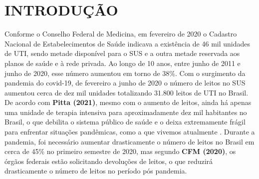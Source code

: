 \documentclass[12pt]{article}
\begin{document}
\section{INTRODUÇÃO}
Conforme o Conselho Federal de Medicina, em fevereiro de 2020 o Cadastro Nacional de Estabelecimentos de Saúde indicava a existência de 46 mil unidades de UTI, sendo metade disponível para o SUS e a outra metade reservada aos planos de saúde e à rede privada. Ao longo de 10 anos, entre junho de 2011 e junho de 2020, esse número aumentou em torno de 38\%. Com o surgimento da pandemia do covid-19, de fevereiro a junho de 2020 o número de leitos no SUS aumentou cerca de dez mil unidades totalizando 31.800 leitos de UTI no Brasil.
De acordo com \textbf{Pitta (2021)}, mesmo com o aumento de leitos, ainda há apenas uma unidade de terapia intensiva para aproximadamente dez mil habitantes no Brasil, o que debilita o sistema público de saúde e o deixa extremamente frágil para enfrentar situações pandêmicas, como a que vivemos atualmente \cite{pimentel2020design}. Durante a pandemia, foi necessário aumentar drasticamente o número de leitos no Brasil em cerca de 45\% no primeiro semestre de 2020, mas segundo \textbf{CFM (2020)}, os órgãos federais estão solicitando devoluções de leitos, o que reduzirá drasticamente o número de leitos no período pós pandemia.
\end{document}
